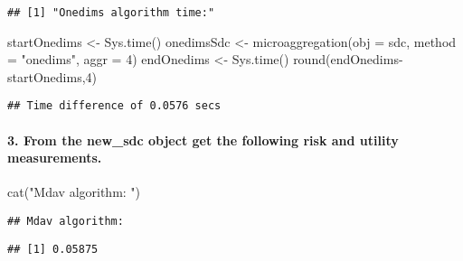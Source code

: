 \documentclass[
]{article}
\newenvironment{Shaded}{\begin{snugshade}}{\end{snugshade}}
\newcommand{\AttributeTok}[1]{\textcolor[rgb]{0.77,0.63,0.00}{#1}}
\newcommand{\DecValTok}[1]{\textcolor[rgb]{0.00,0.00,0.81}{#1}}
\newcommand{\FunctionTok}[1]{\textcolor[rgb]{0.00,0.00,0.00}{#1}}
\newcommand{\NormalTok}[1]{#1}
\newcommand{\OtherTok}[1]{\textcolor[rgb]{0.56,0.35,0.01}{#1}}
\newcommand{\SpecialCharTok}[1]{\textcolor[rgb]{0.00,0.00,0.00}{#1}}
\newcommand{\StringTok}[1]{\textcolor[rgb]{0.31,0.60,0.02}{#1}}
\begin{document}
\begin{verbatim}
## [1] "Onedims algorithm time:"
\end{verbatim}

\begin{Shaded}
\begin{Highlighting}[]
\NormalTok{startOnedims }\OtherTok{\textless{}{-}} \FunctionTok{Sys.time}\NormalTok{()}
\NormalTok{onedimsSdc }\OtherTok{\textless{}{-}} \FunctionTok{microaggregation}\NormalTok{(}\AttributeTok{obj =}\NormalTok{ sdc, }\AttributeTok{method =} \StringTok{"onedims"}\NormalTok{, }\AttributeTok{aggr =} \DecValTok{4}\NormalTok{)}
\NormalTok{endOnedims }\OtherTok{\textless{}{-}} \FunctionTok{Sys.time}\NormalTok{()}
\FunctionTok{round}\NormalTok{(endOnedims}\SpecialCharTok{{-}}\NormalTok{startOnedims,}\DecValTok{4}\NormalTok{)}
\end{Highlighting}
\end{Shaded}

\begin{verbatim}
## Time difference of 0.0576 secs
\end{verbatim}

\hypertarget{from-the-new_sdc-object-get-the-following-risk-and-utility-measurements.}{%
\paragraph{3. From the new\_sdc object get the following risk and
utility
measurements.}\label{from-the-new_sdc-object-get-the-following-risk-and-utility-measurements.}}

\begin{Shaded}
\begin{Highlighting}[]
\FunctionTok{cat}\NormalTok{(}\StringTok{"Mdav algorithm: "}\NormalTok{)}
\end{Highlighting}
\end{Shaded}

\begin{verbatim}
## Mdav algorithm:
\end{verbatim}

\begin{Shaded}
\end{Shaded}

\begin{verbatim}
## [1] 0.05875
\end{verbatim}
\end{document}

